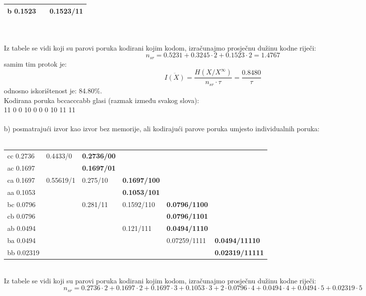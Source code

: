 \documentclass[12pt]{article}
\begin{document}
\begin{enumerate}
\begin{tabular}{|l|l|l}
b 0.1523 &                      & \multicolumn{1}{l|}{\textbf{0.1523/11}} \\ \hline
\end{tabular}
\\
\\
Iz tabele se vidi koji su parovi poruka kodirani kojim kodom, izračunajmo
prosječnu dužinu kodne riječi:
\begin{equation*}
    n_{sr} = 0.5231 + 0.3245 \cdot 2 + 0.1523 \cdot 2 = 1.4767
\end{equation*}
samim tim protok je: 
\begin{equation*}
    \overline{I(X)} = \frac{H(X/X^\infty)}{n_{sr} \cdot \tau} = \frac{0.8480}{\tau}
\end{equation*}
odnosno iskorištenost je: 84.80\%. \\
Kodirana poruka bccacccabb glasi (razmak između svakog slova): \\
11 0 0 10 0 0 0 10 11 11
\\
\\
b) posmatrajući izvor kao izvor bez memorije, ali kodirajući parove poruka umjesto individualnih poruka:
\\
\\

\begin{tabular}{|l|l|l|lll}
\cline{1-3}
cc 0.2736 & \multirow{2}{*}{0.4433/0} & \textbf{0.2736/00} &  &  &  \\ \cline{1-1} \cline{3-3}
ac 0.1697 &  & \textbf{0.1697/01} &  &  &  \\ \cline{1-4}
ca 0.1697 & \multirow{7}{*}{0.55619/1} & \multirow{2}{*}{0.275/10} & \multicolumn{1}{l|}{\textbf{0.1697/100}} &  &  \\ \cline{1-1} \cline{4-4}
aa 0.1053 &  &  & \multicolumn{1}{l|}{\textbf{0.1053/101}} &  &  \\ \cline{1-1} \cline{3-5}
bc 0.0796 &  & \multirow{5}{*}{0.281/11} & \multicolumn{1}{l|}{\multirow{2}{*}{0.1592/110}} & \multicolumn{1}{l|}{\textbf{0.0796/1100}} &  \\ \cline{1-1} \cline{5-5}
cb 0.0796 &  &  & \multicolumn{1}{l|}{} & \multicolumn{1}{l|}{\textbf{0.0796/1101}} &  \\ \cline{1-1} \cline{4-5}
ab 0.0494 &  &  & \multicolumn{1}{l|}{\multirow{3}{*}{0.121/111}} & \multicolumn{1}{l|}{\textbf{0.0494/1110}} &  \\ \cline{1-1} \cline{5-6} 
ba 0.0494 &  &  & \multicolumn{1}{l|}{} & \multicolumn{1}{l|}{\multirow{2}{*}{0.07259/1111}} & \multicolumn{1}{l|}{\textbf{0.0494/11110}} \\ \cline{1-1} \cline{6-6} 
bb 0.02319 &  &  & \multicolumn{1}{l|}{} & \multicolumn{1}{l|}{} & \multicolumn{1}{l|}{\textbf{0.02319/11111}} \\ \hline
\end{tabular}
\\
\newpage
Iz tabele se vidi koji su parovi poruka kodirani kojim kodom, izračunajmo
prosječnu dužinu kodne riječi:
\begin{equation*}
    n_{sr} = 0.2736\cdot2 + 0.1697\cdot2 + 0.1697\cdot3 + 0.1053\cdot3 + 2\cdot0.0796\cdot4 + 0.0494\cdot4 + 0.0494\cdot5 + 0.02319\cdot5
\end{equation*}


\end{enumerate}
\end{document}
